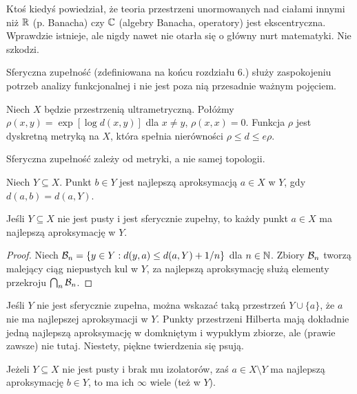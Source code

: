 Ktoś kiedyś powiedział, że teoria przestrzeni unormowanych nad ciałami innymi niż $\mathbb R$ (p. Banacha) czy $\mathbb C$ (algebry Banacha, operatory) jest ekscentryczna.
Wprawdzie istnieje, ale nigdy nawet nie otarła się o główny nurt matematyki.
Nie szkodzi.

Sferyczna zupełność (zdefiniowana na końcu rozdziału 6.) służy zaspokojeniu potrzeb   analizy funkcjonalnej i nie jest poza nią przesadnie ważnym pojęciem.

\begin{fakt}
	Niech $X$ będzie przestrzenią ultrametryczną.
	Połóżmy $\rho(x, y) = \exp [\log d(x, y)]$ dla $x \neq y$, $\rho(x, x) = 0$.
	Funkcja $\rho$ jest dyskretną metryką na $X$, która spełnia nierówności $\rho \le d \le e \rho$.
\end{fakt}

\begin{wniosek}
	Sferyczna zupełność zależy od metryki, a nie samej topologii.
\end{wniosek}

\begin{definicja}
	Niech $Y \subseteq X$.
	Punkt $b \in Y$ jest najlepszą aproksymacją $a \in X$ w $Y$, gdy $d(a, b) = d(a, Y)$.
\end{definicja}

\begin{fakt}
	Jeśli $Y \subseteq X$ nie jest pusty i jest sferycznie zupełny, to każdy punkt $a \in X$ ma najlepszą aproksymację w $Y$.
\end{fakt}

\begin{proof}
	Niech $\mathcal B_n = \{y \in Y : d(y, a) \le d(a, Y) + 1/n\}$ dla $n \in \mathbb N$.
	Zbiory $\mathcal B_n$ tworzą malejący ciąg niepustych kul w $Y$, za najlepszą aproksymację służą elementy przekroju $\bigcap_n \mathcal B_n$.
\end{proof}

Jeśli $Y$ nie jest sferycznie zupełna, można wskazać taką przestrzeń $Y \cup \{a\}$, że $a$ nie ma najlepszej aproksymacji w $Y$.
Punkty przestrzeni Hilberta mają dokładnie jedną najlepszą aproksymację w domkniętym i wypukłym zbiorze, ale (prawie zawsze) nie tutaj.
Niestety, piękne twierdzenia się psują.

\begin{fakt}
	Jeżeli $Y \subseteq X$ nie jest pusty i brak mu izolatorów, zaś $a \in X \setminus Y$ ma najlepszą aproksymację $b \in Y$, to ma ich $\infty$ wiele (też w $Y$).
\end{fakt}

